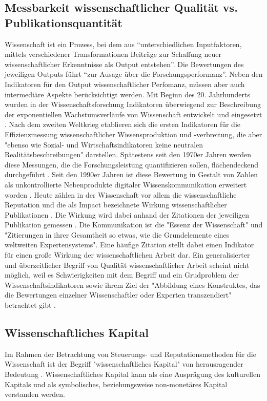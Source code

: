 \subsection{Messbarkeit wissenschaftlicher Qualität vs. Publikationsquantität}
Wissenschaft ist ein Prozess, bei dem aus “unterschiedlichen Inputfaktoren, mittels verschiedener Transformationen Beiträge zur Schaffung neuer wissenschaftlicher Erkenntnisse als Output entstehen”\cite{Jansen_2007}. Die Bewertungen des jeweiligen Outputs führt “zur Ausage über die Forschungsperformanz”. Neben den Indikatoren für den Output wissenschaftlicher Perfomanz, müssen aber auch intermediäre Aspekte berücksichtigt werden\cite{schmoch_2009}. Mit Beginn des 20. Jahrhunderts wurden in der Wissenschaftsforschung Indikatoren überwiegend zur Beschreibung der exponentiellen Wachstumsverläufe von Wissenschaft entwickelt und eingesetzt \cite{Hornbostel_1997}. Nach dem zweiten Weltkrieg etablieren sich die ersten Indikatoren für die Effizienzmessung wissenschaftlicher Wissensproduktion und -verbreitung, die aber "ebenso wie Sozial- und Wirtschaftsindikatoren keine neutralen Realitätsbeschreibungen" \cite{Hornbostel_1997} darstellen. Spätestens seit den 1970er Jahren werden diese Messungen, die die Forschungsleistung quantifizieren sollen, flächendeckend durchgeführt \cite{Hornbostel_1997}. Seit den 1990er Jahren ist diese Bewertung in Gestalt von Zahlen als unkontrollierte Nebenprodukte digitaler Wissenskommunikation erweitert worden \cite{angermueller_2010}. Heute zählen in der Wissenschaft vor allem die wissenschaftliche Reputation und die als Impact bezeichnete Wirkung wissenschaftlicher Publikationen\cite{herb_open_2013} \cite{Hornbostel_1997}. Die Wirkung wird dabei anhand der Zitationen der jeweiligen Publikation gemessen \cite{suchen}. Die Kommunikation ist die "Essenz der Wissenschaft"\cite{bonitz_1998_matthaus} und "Zitierungen in ihrer Gesamtheit so etwas, wie die Grundelemente eines weltweiten Expertensystems"\cite{bonitz_1990_sci}. Eine häufige Zitation stellt dabei einen Indikator für einen große Wirkung der wissenschaftlichen Arbeit dar. Ein generalisierter und überzeitlicher Begriff von Qualität wissenschaftlicher Arbeit scheint nicht möglich, weil es Schwierigkeiten mit dem Begriff und ein Grudproblem der Wissenschaftsindikatoren sowie ihrem Ziel der "Abbildung eines Konstruktes, das die Bewertungen einzelner Wissenschaftler oder Experten transzendiert" betrachtet gibt \cite{Hornbostel_1997}. 

\subsection{Wissenschaftliches Kapital}
Im Rahmen der Betrachtung von Steuerungs- und Reputationsmethoden für die Wissenschaft ist der Begriff "wissenschaftliches Kapital" von herausragender Bedeutung \cite{suchen}. Wissenschaftliches Kapital kann als eine Ausprägung des kulturellen Kapitals und als symbolisches, beziehungsweise non-monetäres Kapital \cite{irmer2011} verstanden werden. 

